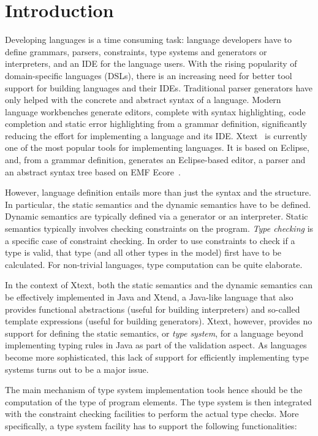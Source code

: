 \section{Introduction}
\label{sec:introduction}
 
Developing languages is a time consuming task: language developers have to
define grammars, parsers, constraints, type systems and generators or
interpreters, and an IDE for the language users. With the rising popularity of
domain-specific languages (DSLs), there is an increasing need for better tool
support for building languages and their IDEs. Traditional parser generators
have only helped with the concrete and abstract syntax of a language. Modern
language workbenches generate editors, complete with syntax highlighting, code
completion and static error highlighting from a grammar definition,
significantly reducing the effort for implementing a language and its IDE.
Xtext~\cite{xtext} is currently one of the most popular tools for implementing
languages.
It is based on Eclipse, and, from a grammar definition, generates an
Eclipse-based editor, a parser and an abstract syntax tree based on EMF
Ecore~\cite{EMF08}.

However, language definition entails more than just the syntax and the
structure. In particular, the static semantics and the dynamic semantics have
to be defined. Dynamic semantics are typically defined via a generator or an
interpreter.  Static semantics typically involves checking constraints on the
program.
\emph{Type checking} is a specific case of constraint checking. In order to use
constraints to check if a type is valid, that type (and all other types in the
model) first have to be calculated. For non-trivial languages, type computation
can be quite elaborate.

In the context of Xtext, both the static semantics and the dynamic semantics can
be effectively implemented in Java and Xtend, a Java-like language that also provides functional
abstractions (useful for building interpreters) and so-called template expressions (useful for
building generators). Xtext, however, provides no support for defining the
static semantics, or \emph{type system}, for a language beyond implementing
typing rules in Java as part of the validation aspect. As languages become more
sophisticated, this lack of support for efficiently implementing type systems
turns out to be a major issue.

The main mechanism of type system implementation tools hence should be the
computation of the type of program elements. The type system is then integrated
with the constraint checking facilities to perform the actual type checks. More
specifically, a type system facility has to support the following
functionalities:

